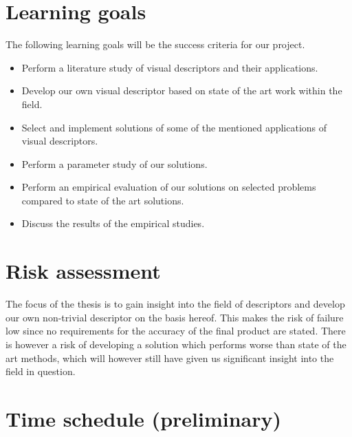 \documentclass[11pt,a4paper]{article}
\begin{document}
\section{Learning goals}
The following learning goals will be the success criteria for our
project.
\begin{itemize}
    \item Perform a literature study of visual descriptors and their
        applications.
    \item Develop our own visual descriptor based on state of the art work
        within the field.
    \item Select and implement solutions of some of the mentioned applications
        of visual descriptors.
    \item Perform a parameter study of our solutions.
    \item Perform an empirical evaluation of our solutions on selected
        problems compared to state of the art solutions.
    \item Discuss the results of the empirical studies.
\end{itemize}

\section{Risk assessment}
The focus of the thesis is to gain insight into the field of descriptors and
develop our own non-trivial descriptor on the basis hereof. This makes the risk
of failure low since no requirements for the accuracy of the final product are
stated. There is however a risk of developing a solution which performs worse
than state of the art methods, which will however still have given us
significant insight into the field in question.

\section{Time schedule \small{(preliminary)}}
\end{document}
